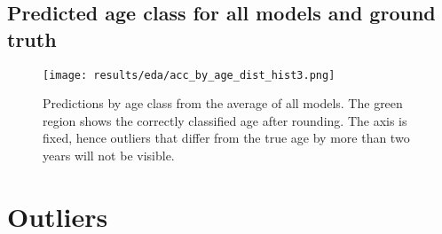 \documentclass[10pt,letterpaper]{article}
\begin{document}
\pagebreak
\subsection*{Predicted age class for all models and ground truth}
\centering
\begin{figure}[ht!]
  \centering
  \texttt{[image: results/eda/acc\_by\_age\_dist\_hist3.png]}
    \caption{Predictions by age class from the average of all models. The green region shows the correctly classified age after rounding. The axis is fixed, hence outliers that differ from the true age by more than two years will not be visible.}
  \label{marker6}    
\end{figure}

\pagebreak

\section*{Outliers}
\end{document}
